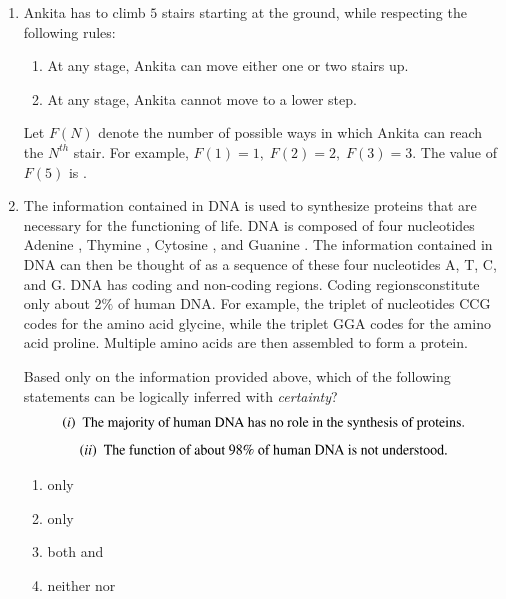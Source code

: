 \documentclass[journal,12pt,onecolumn]{IEEEtran}
\theoremstyle{remark}
\begin{document}
\begin{enumerate}[start=1, label=Q.\arabic*]
\hfill{}

\item Ankita has to climb $5$ stairs starting at the ground, while respecting the following rules:
\begin{enumerate}
\item At any stage, Ankita can move either one or two stairs up.
\item At any stage, Ankita cannot move to a lower step.
\end{enumerate}

Let $F(N)$ denote the number of possible ways in which Ankita can reach the $N^{th}$ stair. For example, $F(1) = 1, \; F(2) = 2, \; F(3) = 3$. The value of $F(5)$ is \underline{\hspace{2cm}}.

\begin{enumerate}
\end{enumerate}

\hfill{}
\item The information contained in DNA is used to synthesize proteins that are necessary for the functioning of life. DNA is composed of four nucleotides\brak{:} Adenine , Thymine , Cytosine , and Guanine . The information contained in DNA can then be thought of as a sequence of these four nucleotides\brak{:} A, T, C, and G. DNA has coding and non\mbox{-}coding regions. Coding regionsconstitute only about $2\%$ of human DNA. For example, the triplet of nucleotides CCG codes for the amino acid glycine, while the triplet GGA codes for the amino acid proline. Multiple amino acids are then assembled to form a protein.

Based only on the information provided above, which of the following statements can be logically inferred with \textit{certainty}?
\[
\text{\ensuremath{\left(i\right)}} \ \ \text{The majority of human DNA has no role in the synthesis of proteins.}
\]
\[
\text{\ensuremath{\left(ii\right)}} \ \ \text{The function of about $98\%$ of human DNA is not understood.}
\]

\begin{enumerate}
\item only 
\item only 
\item both  and 
\item neither  nor 
\end{enumerate}


\end{enumerate}
\end{document}
